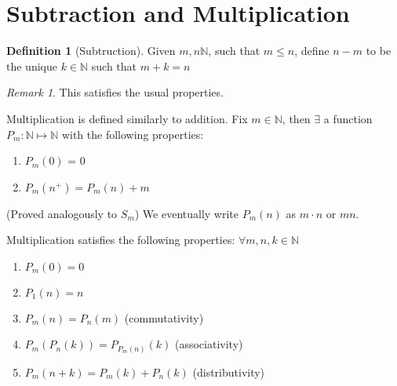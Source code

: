 \documentclass[12pt]{amsart}
\newcommand{\bbN}{\mathbb{N}}
\theoremstyle{plain}
\theoremstyle{remark}
\newtheorem*{rmk}{Remark}
\theoremstyle{definition}
\newtheorem*{define}{Definition}
\begin{document}
\section*{Subtraction and Multiplication}

\begin{define}[Subtruction]
	Given $m, n \bbN$, such that $m \leq n$, define $n - m$ to be the unique $k\in \bbN$ such that $m + k = n$	
\end{define}

\begin{rmk}
	This satisfies the usual properties.
\end{rmk}

\hfill
\par
Multiplication is defined similarly to addition. Fix $m \in \bbN$, then $\exists$ a function $P_m:\bbN \mapsto \bbN$ with the following properties:
\begin{enumerate}[(1)]
	\item
		$P_m(0)$ = 0
	\item
		$P_m(n^+) = P_m(n) + m$
\end{enumerate}
(Proved analogously to $S_m$)
\newline
We eventually write $P_m(n)$ as $m \cdot n$ or $mn$.

\hfill
\par
Multiplication satisfies the following properties: $\forall m, n, k\in \bbN$
\begin{enumerate}
	\item 
		$P_m(0) = 0$
	\item
		$P_1(n) = n$
	\item
		$P_m(n) = P_n(m)$ (commutativity)
	\item
		$P_m\left( P_n(k) \right) = P_{P_m(n)}(k)$ (associativity)
	\item
		$P_m(n + k) = P_m(k) + P_n(k)$ (distributivity)
\end{enumerate}
\end{document}

